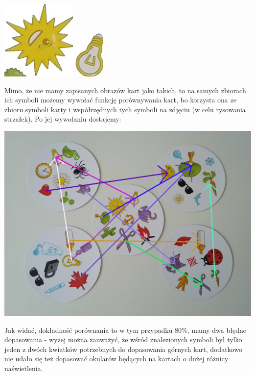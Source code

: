 \documentclass[10pt,a4paper]{article}
\begin{document}
\begin{center}
\includegraphics[scale=0.5]{2.3/card1sign6.jpg}
\includegraphics[scale=0.5]{2.3/card1sign7.jpg}
\end{center}
\newpage
Mimo, że nie mamy zapisanych obrazów kart jako takich, to na samych zbiorach ich symboli możemy wywołać funkcję porównywania kart, bo korzysta ona ze zbioru symboli karty i współrzędnych tych symboli na zdjęciu (w celu rysowania strzałek). Po jej wywołaniu dostajemy:
\begin{center}
\includegraphics[scale=0.25]{2.3/img_arrows0.jpg}
\end{center}
Jak widać, dokładność porównania to w tym przypadku 80\%, mamy dwa błędne dopasowania - wyżej można zauważyć, że wśród znalezionych symboli był tylko jeden z dwóch kwiatków potrzebnych do dopasowania górnych kart, dodatkowo nie udało się też dopasować okularów będących na kartach o dużej różnicy naświetlenia.
\end{document}
